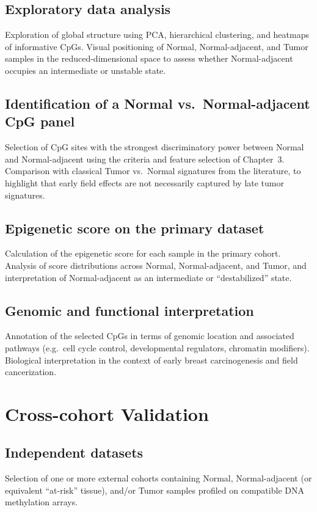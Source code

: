 \documentclass[10pt]{extarticle}
\begin{document}
\subsection{Exploratory data analysis}
Exploration of global structure using PCA, hierarchical clustering, and heatmaps of informative CpGs.  
Visual positioning of Normal, Normal-adjacent, and Tumor samples in the reduced-dimensional space to assess whether Normal-adjacent occupies an intermediate or unstable state.

\subsection{Identification of a Normal vs.\ Normal-adjacent CpG panel}
Selection of CpG sites with the strongest discriminatory power between Normal and Normal-adjacent using the criteria and feature selection of Chapter~3.  
Comparison with classical Tumor vs.\ Normal signatures from the literature, to highlight that early field effects are not necessarily captured by late tumor signatures.

\subsection{Epigenetic score on the primary dataset}
Calculation of the epigenetic score for each sample in the primary cohort.  
Analysis of score distributions across Normal, Normal-adjacent, and Tumor, and interpretation of Normal-adjacent as an intermediate or ``destabilized'' state.

\subsection{Genomic and functional interpretation}
Annotation of the selected CpGs in terms of genomic location and associated pathways (e.g.\ cell cycle control, developmental regulators, chromatin modifiers).  
Biological interpretation in the context of early breast carcinogenesis and field cancerization.


\section{Cross-cohort Validation}

\subsection{Independent datasets}
Selection of one or more external cohorts containing Normal, Normal-adjacent (or equivalent ``at-risk'' tissue), and/or Tumor samples profiled on compatible DNA methylation arrays.
\end{document}
